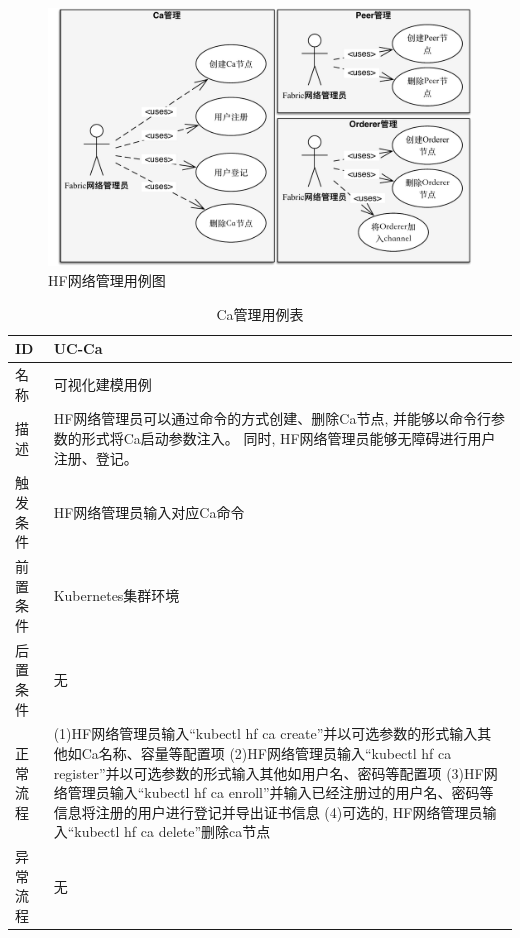 \begin{figure}[!htbp] %
    \centering %
    \includegraphics[width=1.0\textwidth]{FIGs/chapter4/fabric_use_case.pdf} %
    \caption{HF网络管理用例图} %
    \label{fabric_use_case} %
\end{figure}%

{\footnotesize
\begin{longtable}[h]{m{60pt}|m{280pt}}
    \caption[Ca管理用例表]{Ca管理用例表} \label{ca_use_case} \\
        \hline  
        ID&UC-Ca\\
        \hline
        名称&可视化建模用例\\
        \hline
        描述&HF网络管理员可以通过命令的方式创建、删除Ca节点, 并能够以命令行参数的形式将Ca启动参数注入。 同时, HF网络管理员能够无障碍进行用户注册、登记。\\
        \hline
        触发条件&HF网络管理员输入对应Ca命令\\
        \hline
        前置条件&Kubernetes集群环境\\
        \hline
        后置条件&无\\
        \hline
        正常流程& (1)HF网络管理员输入“kubectl hf ca create”并以可选参数的形式输入其他如Ca名称、容量等配置项
        \newline (2)HF网络管理员输入“kubectl hf ca register”并以可选参数的形式输入其他如用户名、密码等配置项
        \newline (3)HF网络管理员输入“kubectl hf ca enroll”并输入已经注册过的用户名、密码等信息将注册的用户进行登记并导出证书信息
        \newline (4)可选的, HF网络管理员输入“kubectl hf ca delete”删除ca节点 \\
        \hline
        异常流程&无\\
        \hline
    \end{longtable} 
}

